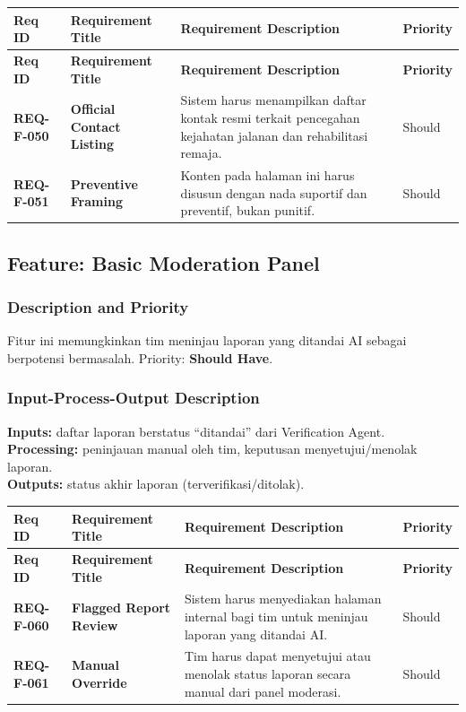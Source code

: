 \documentclass[11pt,a4paper]{article}
\newcommand{\req}[4]{\textbf{#1} & \textbf{#2} & #3 & #4 \\ \hline}
\begin{document}
\begin{longtable}{|L{2.3cm}|L{4.0cm}|L{6.9cm}|L{1.6cm}|}
\hline
{}\textbf{Req ID} & \textbf{Requirement Title} & \textbf{Requirement Description} & \textbf{Priority} \\ \hline
\endfirsthead
\hline
{}\textbf{Req ID} & \textbf{Requirement Title} & \textbf{Requirement Description} & \textbf{Priority} \\ \hline
\endhead
\req{REQ-F-050}{Official Contact Listing}{Sistem harus menampilkan daftar kontak resmi terkait pencegahan kejahatan jalanan dan rehabilitasi remaja.}{Should}
\req{REQ-F-051}{Preventive Framing}{Konten pada halaman ini harus disusun dengan nada suportif dan preventif, bukan punitif.}{Should}
\end{longtable}

\subsection{Feature: Basic Moderation Panel}
\subsubsection{Description and Priority}
Fitur ini memungkinkan tim meninjau laporan yang ditandai AI sebagai berpotensi bermasalah. Priority: \textbf{Should Have}.

\subsubsection{Input-Process-Output Description}
\textbf{Inputs:} daftar laporan berstatus ``ditandai'' dari Verification Agent.\\
\textbf{Processing:} peninjauan manual oleh tim, keputusan menyetujui/menolak laporan.\\
\textbf{Outputs:} status akhir laporan (terverifikasi/ditolak).

\begin{longtable}{|L{2.3cm}|L{4.0cm}|L{6.9cm}|L{1.6cm}|}
\hline
{}\textbf{Req ID} & \textbf{Requirement Title} & \textbf{Requirement Description} & \textbf{Priority} \\ \hline
\endfirsthead
\hline
{}\textbf{Req ID} & \textbf{Requirement Title} & \textbf{Requirement Description} & \textbf{Priority} \\ \hline
\endhead
\req{REQ-F-060}{Flagged Report Review}{Sistem harus menyediakan halaman internal bagi tim untuk meninjau laporan yang ditandai AI.}{Should}
\req{REQ-F-061}{Manual Override}{Tim harus dapat menyetujui atau menolak status laporan secara manual dari panel moderasi.}{Should}
\end{longtable}
\end{document}
